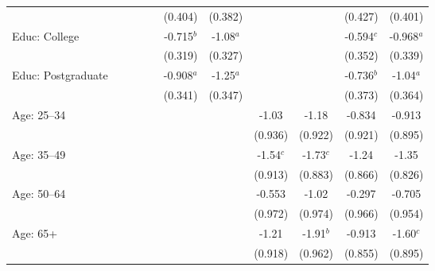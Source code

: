 \begin{tabular}{lcccccccccc}
                             &              &              &            &             & (0.404)      & (0.382)     &             &             & (0.427)      & (0.401)\\   
   Educ: College             &              &              &            &             & -0.715$^{b}$ & -1.08$^{a}$ &             &             & -0.594$^{c}$ & -0.968$^{a}$\\   
                             &              &              &            &             & (0.319)      & (0.327)     &             &             & (0.352)      & (0.339)\\   
   Educ: Postgraduate        &              &              &            &             & -0.908$^{a}$ & -1.25$^{a}$ &             &             & -0.736$^{b}$ & -1.04$^{a}$\\   
                             &              &              &            &             & (0.341)      & (0.347)     &             &             & (0.373)      & (0.364)\\   
   Age: 25--34               &              &              &            &             &              &             & -1.03       & -1.18       & -0.834       & -0.913\\   
                             &              &              &            &             &              &             & (0.936)     & (0.922)     & (0.921)      & (0.895)\\   
   Age: 35--49               &              &              &            &             &              &             & -1.54$^{c}$ & -1.73$^{c}$ & -1.24        & -1.35\\   
                             &              &              &            &             &              &             & (0.913)     & (0.883)     & (0.866)      & (0.826)\\   
   Age: 50--64               &              &              &            &             &              &             & -0.553      & -1.02       & -0.297       & -0.705\\   
                             &              &              &            &             &              &             & (0.972)     & (0.974)     & (0.966)      & (0.954)\\   
   Age: 65+                  &              &              &            &             &              &             & -1.21       & -1.91$^{b}$ & -0.913       & -1.60$^{c}$\\   
                             &              &              &            &             &              &             & (0.918)     & (0.962)     & (0.855)      & (0.895)\\   

\end{tabular}
